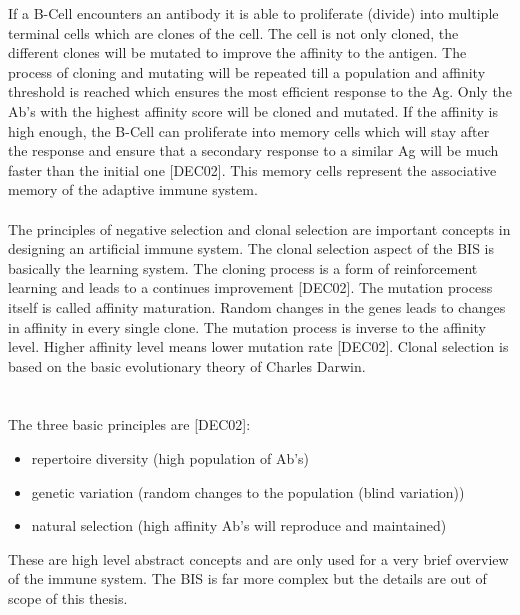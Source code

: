If a B-Cell encounters an antibody it is able to proliferate (divide) into multiple terminal cells which are clones of the cell. The cell is not only cloned, the different clones will be mutated to improve the affinity to the antigen. The process of cloning and mutating will be repeated till a population and affinity threshold is reached which ensures the most efficient response to the Ag. Only the Ab’s with the highest affinity score will be cloned and mutated. If the affinity is high enough, the B-Cell can proliferate into memory cells which will stay after the response and ensure that a secondary response to a similar Ag will be much faster than the initial one [DEC02]. This memory cells represent the associative memory of the adaptive immune system. 
\\\\
The principles of negative selection and clonal selection are important concepts in designing an artificial immune system. The clonal selection aspect of the BIS is basically the learning system. The cloning process is a form of reinforcement learning and leads to a continues improvement [DEC02].
The mutation process itself is called affinity maturation. Random changes in the genes leads to changes in affinity in every single clone. The mutation process is inverse to the affinity level. Higher affinity level means lower mutation rate [DEC02].  
Clonal selection is based on the basic evolutionary theory of Charles Darwin.\\\\\\ The three basic principles are [DEC02]:
\\
\begin{itemize}
	\item 	repertoire diversity (high population of Ab’s)
	\item 	genetic variation (random changes to the population (blind variation))
	\item 	natural selection (high affinity Ab’s will reproduce and maintained) 
	
\end{itemize}

These are high level abstract concepts and are only used for a very brief overview of the immune system. The BIS is far more complex but the details are out of scope of this thesis.



